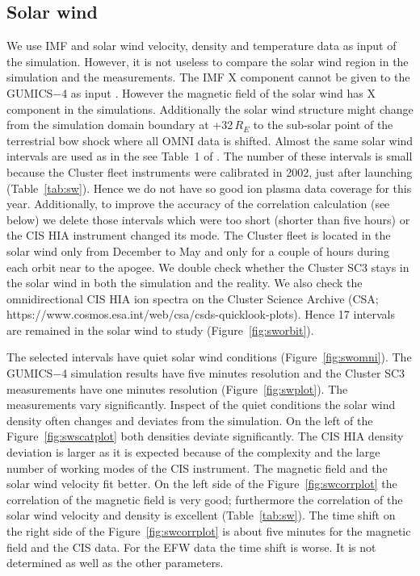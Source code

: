 \documentclass[linenumbers,draft]{agujournal}
\begin{document}
\subsection{Solar wind}
\label{sec:sw}

We use IMF and solar wind velocity, density and temperature data as input of the simulation. However, it is not useless to compare the solar wind region in the simulation and the measurements. The IMF X component cannot be given to the GUMICS$-$4 as input \citep{janhunen12:_gumic_mhd,facsko16:_one_earth}. However the magnetic field of the solar wind has X component in the simulations. Additionally the solar wind structure might change from the simulation domain boundary at +32\,$R_E$ to the sub-solar point of the terrestrial bow shock where all OMNI data is shifted. Almost the same solar wind intervals are used as in the see Table~1 of \citet{facsko16:_one_earth}. The number of these intervals is small because the Cluster fleet instruments were calibrated in 2002, just after launching (Table~\ref{tab:sw}). Hence we do not have so good ion plasma data coverage for this year. Additionally, to improve the accuracy of the correlation calculation (see below) we delete those intervals which were too short (shorter than five hours) or the CIS HIA instrument changed its mode. The Cluster fleet is located in the solar wind only from December to May and only for a couple of hours during each orbit near to the apogee. We double check whether the Cluster SC3 stays in the solar wind in both the simulation and the reality. We also check the omnidirectional CIS HIA ion spectra on the Cluster Science Archive (CSA; https://www.cosmos.esa.int/web/csa/csds-quicklook-plots). Hence 17 intervals are remained in the solar wind to study (Figure~\ref{fig:sworbit}). 

The selected intervals have quiet solar wind conditions (Figure~\ref{fig:swomni}). The GUMICS$-$4 simulation results have five minutes resolution and the Cluster SC3 measurements have one minutes resolution (Figure~\ref{fig:swplot}). The measurements vary significantly. Inspect of the quiet conditions the solar wind density often changes and deviates from the simulation. On the left of the Figure~\ref{fig:swscatplot} both densities deviate significantly. The CIS HIA density deviation is larger as it is expected because of the complexity and the large number of working modes of the CIS instrument. The magnetic field and the solar wind velocity fit better. On the left side of the Figure~\ref{fig:swcorrplot} the correlation of the magnetic field is very good; furthermore the correlation of the solar wind velocity and density is excellent (Table~\ref{tab:sw}). The time shift on the right side of the Figure~\ref{fig:swcorrplot} is about five minutes for the magnetic field and the CIS data. For the EFW data the time shift is worse. It is not determined as well as the other parameters.
\end{document}
